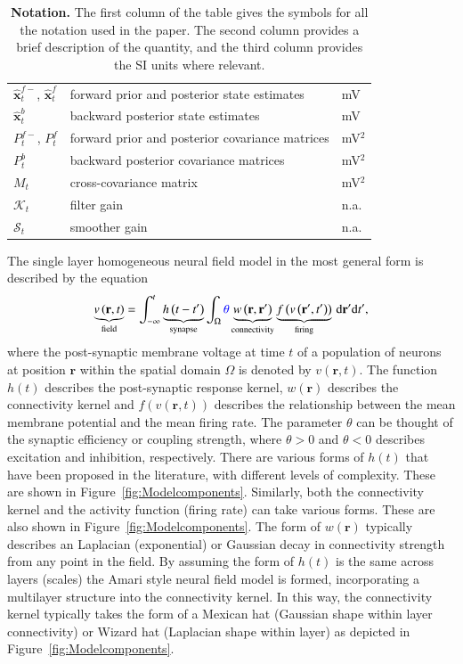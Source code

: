 \documentclass[review,authoryear,3p]{elsarticle}
\newcommand{\parham}[1]{\textcolor{blue}{#1}}
\begin{document}
\begin{table}[!t]
\begin{tabular}{|l|l|l|}
	\hline
	$\hat{\mathbf{x}}_t^{f-}$, $\hat{\mathbf{x}}_t^f$ & forward prior and posterior state estimates & mV\\
	$\hat{\mathbf{x}}_t^{b}$ & backward posterior state estimates & mV\\
	$P^{f-}_t$, $P^f_t$  & forward prior and posterior covariance matrices & mV$^2$\\
	$P^b_t$ & backward posterior covariance matrices & mV$^2$\\
	$M_t$& cross-covariance matrix & mV$^2$\\
	$\mathcal K_{t} $ & filter gain & n.a.\\ 
	$\mathcal S_{t} $ & smoother gain & n.a.\\
	\hline
\end{tabular}
\caption{\textbf{Notation.} The first column of the table gives the symbols for all the notation used in the paper. The second column provides a brief description of the quantity, and the third column provides the SI units where relevant.}
\label{tab:Notation}
\end{table}  
\doublespacing

The single layer homogeneous neural field model in the most general form is described by the equation
\begin{equation}
	\label{FullDoubleIntModel} \underbrace{v\left(\mathbf{r},t\right)}_{\text{field}} =
	\int_{-\infty}^t 
	\underbrace{h\left(t - t'\right)}_{\text{synapse}} \int_\Omega
	\parham{\theta}\underbrace{w\left(\mathbf{r},\mathbf{r}'\right)}_{\text{connectivity}} 
	\underbrace{f\left( v\left( \mathbf{r}',t' \right)\right)}_{\text{firing}}
	\, \mathrm{d}\mathbf{r}'\mathrm{d}t',
\end{equation}
where the post-synaptic membrane voltage at time $t$ of a population of neurons at position $\mathbf r$ within the spatial domain $\Omega$ is denoted by $v\left(\mathbf r,t\right)$. The function $h(t)$ describes the post-synaptic response kernel, $w(\mathbf{r})$ describes the connectivity kernel and $f(v(\mathbf{r},t))$ describes the relationship between the mean membrane potential and the mean firing rate. The parameter $\theta$ can be thought of the synaptic efficiency or coupling strength, where $\theta>0$ and $\theta<0$ describes excitation and inhibition, respectively. There are various forms of $h(t)$ that have been proposed in the literature, with different levels of complexity. These are shown in Figure~\ref{fig:Modelcomponents}. Similarly, both the connectivity kernel and the activity function (firing rate) can take various forms. These are also shown in Figure~\ref{fig:Modelcomponents}. The form of $w(\mathbf{r})$ typically describes an Laplacian (exponential) or Gaussian decay in connectivity strength from any point in the field. By assuming the form of $h(t)$ is the same across layers (scales) the Amari style neural field model is formed, incorporating a multilayer structure into the connectivity kernel. In this way, the connectivity kernel typically takes the form of a Mexican hat (Gaussian shape within layer connectivity) or Wizard hat (Laplacian shape within layer) as depicted in Figure~\ref{fig:Modelcomponents}.
\end{document}
